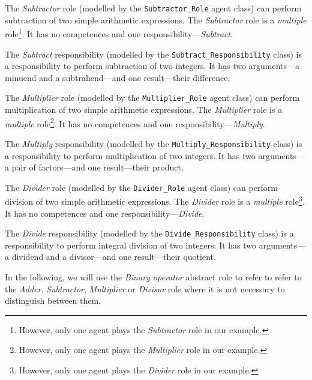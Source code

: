 The \textit{Subtractor} role (modelled by the \texttt{Subtractor\_Role} agent class) can perform subtraction of two simple arithmetic expressions.
The \textit{Subtractor} role is a \textit{multiple} role\footnote{However, only one agent plays the \textit{Subtractor} role in our example.}.
It has no competences and one responsibility---\textit{Subtract}.

The \textit{Subtract} responsibility (modelled by the \texttt{Subtract\_Responsibility} class) is a responsibility to perform subtraction of two integers.
It has two arguments---a minuend and a subtrahend---and one result---their difference.

The \textit{Multiplier} role (modelled by the \texttt{Multiplier\_Role} agent class) can perform multiplication of two simple arithmetic expressions.
The \textit{Multiplier} role is a \textit{multiple} role\footnote{However, only one agent plays the \textit{Multiplier} role in our example.}.
It has no competences and one responsibility---\textit{Multiply}.

The \textit{Multiply} responsibility (modelled by the \texttt{Multiply\_Responsibility} class) is a responsibility to perform multiplication of two integers.
It has two arguments---a pair of factors---and one result---their product.

The \textit{Divider} role (modelled by the \texttt{Divider\_Role} agent class) can perform division of two simple arithmetic expressions.
The \textit{Divider} role is a \textit{multiple} role\footnote{However, only one agent plays the \textit{Divider} role in our example.}.
It has no competences and one responsibility---\textit{Divide}.

The \textit{Divide} responsibility (modelled by the \texttt{Divide\_Responsibility} class) is a responsibility to perform integral division of two integers.
It has two arguments---a dividend and a divisor---and one result---their quotient.

In the following, we will use the \textit{Binary operator} abstract role to refer to refer to the \textit{Adder}, \textit{Subtractor}, \textit{Multiplier} or \textit{Divisor} role where it is not necessary to distinguish between them.

